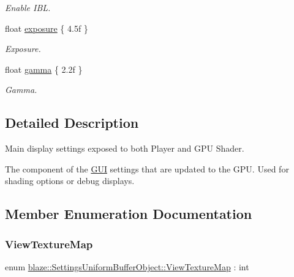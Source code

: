 \begin{DoxyCompactItemize}
\begin{tabbing}
\end{tabbing}\begin{DoxyCompactList}\small\item\em Enable I\+BL. \end{DoxyCompactList}\item 
\mbox{\label{structblaze_1_1SettingsUniformBufferObject_a4c7ec4fafdfbd6a01cda0802118e4c13}} 
float \hyperlink{structblaze_1_1SettingsUniformBufferObject_a4c7ec4fafdfbd6a01cda0802118e4c13}{exposure} \{ 4.\+5f \}
\begin{DoxyCompactList}\small\item\em Exposure. \end{DoxyCompactList}\item 
\mbox{\label{structblaze_1_1SettingsUniformBufferObject_a1b63f9ce0a34995bc5ea11eb1ce9bbc6}} 
float \hyperlink{structblaze_1_1SettingsUniformBufferObject_a1b63f9ce0a34995bc5ea11eb1ce9bbc6}{gamma} \{ 2.\+2f \}
\begin{DoxyCompactList}\small\item\em Gamma. \end{DoxyCompactList}\end{DoxyCompactItemize}


\subsection{Detailed Description}
Main display settings exposed to both Player and G\+PU Shader. 

The component of the \hyperlink{classblaze_1_1GUI}{G\+UI} settings that are updated to the G\+PU. Used for shading options or debug displays. 

\subsection{Member Enumeration Documentation}
\mbox{\label{structblaze_1_1SettingsUniformBufferObject_a713e01d20c85cc832626133616f90843}} 
\subsubsection{\texorpdfstring{View\+Texture\+Map}{ViewTextureMap}}
{\footnotesize\ttfamily enum \hyperlink{structblaze_1_1SettingsUniformBufferObject_a713e01d20c85cc832626133616f90843}{blaze\+::\+Settings\+Uniform\+Buffer\+Object\+::\+View\+Texture\+Map} \+: int}



